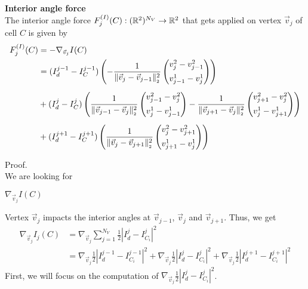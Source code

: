 \begin{proposition} \textbf{Interior angle force} \\

	The interior angle force $F^{(I)}_j(C): (\mathbb{R}^2)^{N_V} \rightarrow \mathbb{R}^2$ that gets applied on vertex $\vec{v}_j$ of cell $C$ is given by 
	\begin{align}
		\begin{split}
			F^{(I)}_j(C) &= - \nabla_{\vec{v}_j} I(C)  \\
				&= (I^{j-1}_d - I^{j-1}_{C}) \left( 
					- \frac{1}{\norm[\vec{v}_{j} - \vec{v}_{j-1}]^2} \begin{pmatrix}
						v_{j}^2 - v_{j-1}^2 \\[0.5em]
						v_{j-1}^1 - v_{j}^1
					\end{pmatrix} 
				\right) \\[0.5em] 
			&+ (I^{j}_d - I^{j}_{C}) \left( 
				\frac{1}{\norm[\vec{v}_{j-1} - \vec{v}_j]^2} \begin{pmatrix}
				v_{j-1}^2 - v_{j}^2 \\[0.5em]
				v_{j}^1 - v_{j-1}^1
				\end{pmatrix} 
				- \frac{1}{\norm[\vec{v}_{j+1} - \vec{v}_j]^2} \begin{pmatrix}
				v_{j+1}^2 - v_{j}^2 \\[0.5em]
				v_{j}^1 - v_{j+1}^1
				\end{pmatrix} 
				\right) \\[0.5em] 
			&+ (I^{j+1}_d - I^{j+1}_{C}) \left( 
				\frac{1}{\norm[\vec{v}_{j} - \vec{v}_{j+1}]^2} \begin{pmatrix}
				v_{j}^2 - v_{j+1}^2 \\[0.5em]
				v_{j+1}^1 - v_{j}^1
				\end{pmatrix} 
				\right) %
		\end{split}
	\end{align}


	Proof. \\
	We are looking for 
	\begin{center}
		$
		\nabla_{\vec{v}_j} I(C)
		$
	\end{center}
	
	Vertex $\vec{v}_j$ impacts the interior angles at $\vec{v}_{j-1}$, $\vec{v}_j$ and $\vec{v}_{j+1}$. 
	Thus, we get 
	\begin{align*}
		\nabla_{\vec{v}_j}  I_{j}(C) &=  \nabla_{\vec{v}_j} \sum\limits_{j=1}^{N_V} \frac{1}{2}| I^{j}_d - I^j_{C_i} |^2 \\
		&= \nabla_{\vec{v}_j} \frac{1}{2}| I^{j-1}_d - I^{j-1}_{C_i} |^2 
		+ \nabla_{\vec{v}_j} \frac{1}{2}| I^{j}_d - I^{j}_{C_i} |^2 
		+ \nabla_{\vec{v}_j} \frac{1}{2}| I^{j+1}_d - I^{j+1}_{C_i} |^2
	\end{align*}
	First, we will focus on the computation of $\nabla_{\vec{v}_j} \frac{1}{2}| I^{j}_d - I^{j}_{C_i} |^2$. 


\end{proposition}
